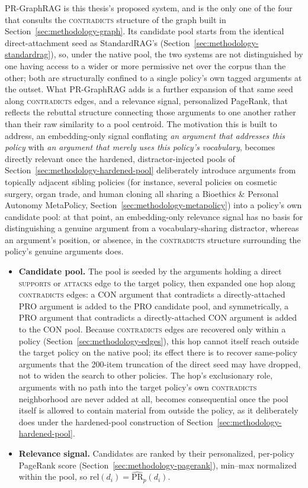 PR-GraphRAG is this thesis's proposed system, and is the only one of the four that consults the
\textsc{contradicts} structure of the graph built in Section~\ref{sec:methodology-graph}. Its
candidate pool starts from the identical direct-attachment seed as StandardRAG's
(Section~\ref{sec:methodology-standardrag}), so, under the native pool, the two systems are not
distinguished by one having access to a wider or more permissive net over the corpus than the
other; both are structurally confined to a single policy's own tagged arguments at the outset.
What PR-GraphRAG adds is a further expansion of that same seed along \textsc{contradicts} edges,
and a relevance signal, personalized PageRank, that reflects the rebuttal structure connecting
those arguments to one another rather than their raw similarity to a pool centroid. The
motivation this is built to address, an embedding-only signal conflating \emph{an argument that
addresses this policy} with \emph{an argument that merely uses this policy's vocabulary}, becomes
directly relevant once the hardened, distractor-injected pools of
Section~\ref{sec:methodology-hardened-pool} deliberately introduce arguments from topically
adjacent sibling policies (for instance, several policies on cosmetic surgery, organ trade, and
human cloning all sharing a Bioethics \& Personal Autonomy MetaPolicy,
Section~\ref{sec:methodology-metapolicy}) into a policy's own candidate pool: at that point, an
embedding-only relevance signal has no basis for distinguishing a genuine argument from a
vocabulary-sharing distractor, whereas an argument's position, or absence, in the
\textsc{contradicts} structure surrounding the policy's genuine arguments does.

\begin{itemize}
\item \textbf{Candidate pool.} The pool is seeded by the arguments holding a direct
\textsc{supports} or \textsc{attacks} edge to the target policy, then expanded one hop along
\textsc{contradicts} edges: a CON argument that contradicts a directly-attached PRO argument is
added to the PRO candidate pool, and symmetrically, a PRO argument that contradicts a
directly-attached CON argument is added to the CON pool. Because \textsc{contradicts} edges are
recovered only within a policy (Section~\ref{sec:methodology-edges}), this hop cannot itself reach
outside the target policy on the native pool; its effect there is to recover same-policy arguments
that the 200-item truncation of the direct seed may have dropped, not to widen the search to other
policies. The hop's exclusionary role, arguments with no path into the target policy's own
\textsc{contradicts} neighborhood are never added at all, becomes consequential once the pool
itself is allowed to contain material from outside the policy, as it deliberately does under the
hardened-pool construction of Section~\ref{sec:methodology-hardened-pool}.

\item \textbf{Relevance signal.} Candidates are ranked by their personalized, per-policy PageRank
score (Section~\ref{sec:methodology-pagerank}), min--max normalized within the pool, so
$\mathrm{rel}(d_i) = \widehat{\mathrm{PR}}_p(d_i)$.
\end{itemize}

